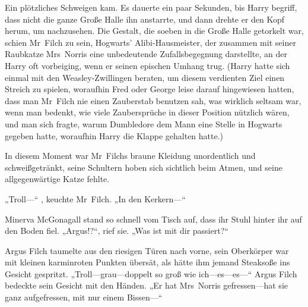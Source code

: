 Ein plötzliches Schweigen kam. Es dauerte ein paar Sekunden, bis Harry begriff, dass nicht die ganze Große Halle ihn anstarrte, und dann drehte er den Kopf herum, um nachzusehen. Die Gestalt, die soeben in die Große Halle getorkelt war, schien Mr~Filch zu sein, Hogwarts' Alibi-Hausmeister, der zusammen mit seiner Raubkatze Mrs~Norris eine unbedeutende Zufallsbegegnung darstellte, an der Harry oft vorbeiging, wenn er seinen epischen Umhang trug. (Harry hatte sich einmal mit den Weasley-Zwillingen beraten, um diesem verdienten Ziel einen Streich zu spielen, woraufhin Fred oder George leise darauf hingewiesen hatten, dass man Mr~Filch nie einen Zauberstab benutzen sah, was wirklich seltsam war, wenn man bedenkt, wie viele Zaubersprüche in dieser Position nützlich wären, und man sich fragte, warum Dumbledore dem Mann eine Stelle in Hogwarts gegeben hatte, woraufhin Harry die Klappe gehalten hatte.)

In diesem Moment war Mr~Filchs braune Kleidung unordentlich und schweißgetränkt, seine Schultern hoben sich sichtlich beim Atmen, und seine allgegenwärtige Katze fehlte.

„Troll—“ , keuchte Mr~Filch. „In den Kerkern—“

\later


Minerva McGonagall stand so schnell vom Tisch auf, dass ihr Stuhl hinter ihr auf den Boden fiel.
„Argus!?“, rief sie. „Was ist mit dir passiert?“

Argus Filch taumelte aus den riesigen Türen nach vorne, sein Oberkörper war mit kleinen karminroten Punkten übersät, als hätte ihm jemand Steaksoße ins Gesicht gespritzt.
„Troll—grau—doppelt so groß wie ich—es—es—“ Argus Filch bedeckte sein Gesicht mit den Händen. „Er hat Mrs~Norris gefressen—hat sie ganz aufgefressen, mit nur einem Bissen—“

